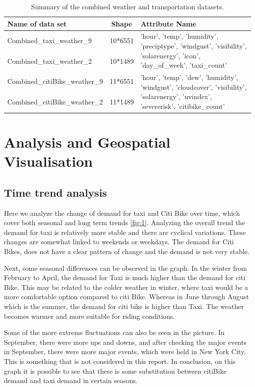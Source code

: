 \documentclass[11pt]{article}
\begin{document}
\begin{table}[h!]
\centering
\begin{tabular}{|l|c|p{8cm}|}
\hline
\textbf{Name of data set} & \textbf{Shape} & \textbf{Attribute Name} \\ \hline
Combined\_taxi\_weather\_9 & 10*6551 & \multirow{2}{8cm}{'hour', 'temp', 'humidity', 'preciptype', 'windgust', 'visibility', 'solarenergy', 'icon', 'day\_of\_week', 'taxi\_count'} \\ \cline{1-2}
Combined\_taxi\_weather\_2 & 10*1489 & \\ \hline
Combined\_citiBike\_weather\_9 & 11*6551 & \multirow{2}{8cm}{'hour', 'temp', 'dew', 'humidity', 'windgust', 'cloudcover', 'visibility', 'solarenergy', 'uvindex', 'severerisk', 'citibike\_count'} \\ \cline{1-2}
Combined\_citiBike\_weather\_2 & 11*1489 & \\ \hline
\end{tabular}
\caption{Summary of the combined weather and transportation datasets.}
\label{tab:combined_data}
\end{table}


\section{Analysis and Geospatial Visualisation}
\subsection{Time trend analysis}
Here we analyze the change of demand for taxi and Citi Bike over time, which cover both seasonal and long term trends \ref{fig:1}. Analyzing the overall trend the demand for taxi is relatively more stable and there are cyclical variations. These changes are somewhat linked to weekends or weekdays. The demand for Citi Bikes, does not have a clear pattern of change and the demand is not very stable.

Next, some seasonal differences can be observed in the graph. In the winter from February to April, the demand for Taxi is much higher than the demand for citi Bike. This may be related to the colder weather in winter, where taxi would be a more comfortable option compared to citi Bike. Whereas in June through August which is the summer, the demand for citi bike is higher than Taxi. The weather becomes warmer and more suitable for riding conditions.

Some of the more extreme fluctuations can also be seen in the picture. In September, there were more ups and downs, and after checking the major events in September\cite{nycguide}, there were more major events,  which were held in New York City. This is something that is not considered in this report.
In conclusion, on this graph it is possible to see that there is some substitution between citiBike demand and taxi demand in certain seasons.
\end{document}
